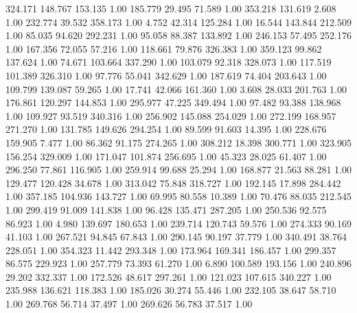  324.171  148.767  153.135         1.00
 185.779   29.495   71.589         1.00
 353.218  131.619    2.608         1.00
 232.774   39.532  358.173         1.00
   4.752   42.314  125.284         1.00
  16.544  143.844  212.509         1.00
  85.035   94.620  292.231         1.00
  95.058   88.387  133.892         1.00
 246.153   57.495  252.176         1.00
 167.356   72.055   57.216         1.00
 118.661   79.876  326.383         1.00
 359.123   99.862  137.624         1.00
  74.671  103.664  337.290         1.00
 103.079   92.318  328.073         1.00
 117.519  101.389  326.310         1.00
  97.776   55.041  342.629         1.00
 187.619   74.404  203.643         1.00
 109.799  139.087   59.265         1.00
  17.741   42.066  161.360         1.00
   3.608   28.033  201.763         1.00
 176.861  120.297  144.853         1.00
 295.977   47.225  349.494         1.00
  97.482   93.388  138.968         1.00
 109.927   93.519  340.316         1.00
 256.902  145.088  254.029         1.00
 272.199  168.957  271.270         1.00
 131.785  149.626  294.254         1.00
  89.599   91.603   14.395         1.00
 228.676  159.905    7.477         1.00
  86.362   91.175  274.265         1.00
 308.212   18.398  300.771         1.00
 323.905  156.254  329.009         1.00
 171.047  101.874  256.695         1.00
  45.323   28.025   61.407         1.00
 296.250   77.861  116.905         1.00
 259.914   99.688   25.294         1.00
 168.877   21.563   88.281         1.00
 129.477  120.428   34.678         1.00
 313.042   75.848  318.727         1.00
 192.145   17.898  284.442         1.00
 357.185  104.936  143.727         1.00
  69.995   80.558   10.389         1.00
  70.476   88.035  212.545         1.00
 299.419   91.009  141.838         1.00
  96.428  135.471  287.205         1.00
 250.536   92.575   86.923         1.00
   4.980  139.697  180.653         1.00
 239.714  120.743   59.576         1.00
 274.333   90.169   41.103         1.00
 267.521   94.845   67.843         1.00
 290.145   90.197   37.779         1.00
 340.491   38.764  228.051         1.00
 354.323   11.442  293.348         1.00
 173.964  169.341  186.457         1.00
 299.357   86.575  229.923         1.00
 257.779   73.393   61.270         1.00
   6.890  100.589  193.156         1.00
 240.896   29.202  332.337         1.00
 172.526   48.617  297.261         1.00
 121.023  107.615  340.227         1.00
 235.988  136.621  118.383         1.00
 185.026   30.274   55.446         1.00
 232.105   38.647   58.710         1.00
 269.768   56.714   37.497         1.00
 269.626   56.783   37.517         1.00
